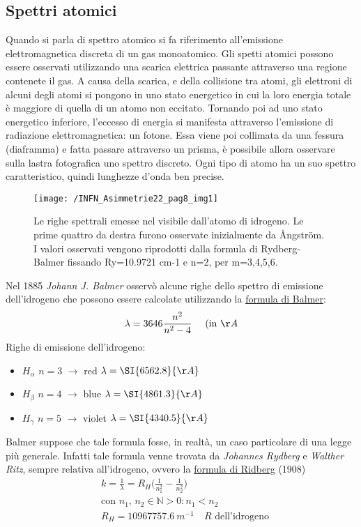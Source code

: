 \subsection{Spettri atomici} 
Quando si parla di spettro atomico si fa riferimento all'emissione elettromagnetica discreta di un gas monoatomico.
Gli spetti atomici possono essere osservati utilizzando una scarica elettrica passante attraverso una regione contenete il gas.
A causa della scarica, e della collisione tra atomi, gli elettroni di alcuni degli atomi si pongono in uno stato energetico in cui la loro energia totale è maggiore di quella di un atomo non eccitato.
Tornando poi ad uno stato energetico inferiore, l'eccesso di energia si manifesta attraverso l'emissione di radiazione elettromagnetica: un fotone.
Essa viene poi collimata da una fessura (diaframma) e fatta passare attraverso un prisma, è possibile allora osservare sulla lastra fotografica uno spettro discreto.
Ogni tipo di atomo ha un suo spettro caratteristico, quindi lunghezze d'onda ben precise.
\begin{figure}[h]
\centering
\texttt{[image: /INFN\_Asimmetrie22\_pag8\_img1]}
\caption{Le righe spettrali emesse nel visibile dall’atomo di idrogeno. Le prime quattro da destra furono osservate inizialmente da Ångström. I valori osservati vengono riprodotti dalla formula di Rydberg-Balmer fissando Ry=10.9721 cm-1 e n=2, per m=3,4,5,6.}
\end{figure}
Nel 1885 \textit{Johann J. Balmer} osservò alcune righe dello spettro di emissione dell'idrogeno che possono essere calcolate utilizzando la \underline{formula di Balmer}:
\begin{equation}
\lambda = 3646 \frac{n^2}{n^2 - 4} \quad \mbox{ (in $\AA$}
\end{equation}
Righe di emissione dell'idrogeno:
\begin{itemize}
\item $H_{\alpha}$ $n=3$ $\rightarrow$ red $\lambda = \SI{6562.8}{\AA}$
\item $H_{\beta}$ $n=4$ $\rightarrow$ blue $\lambda = \SI{4861.3}{\AA}$
\item $H_{\gamma}$ $n=5$ $\rightarrow$ violet $\lambda = \SI{4340.5}{\AA}$
\end{itemize}
Balmer suppose che tale formula fosse, in realtà, un caso particolare di una legge più generale.
Infatti tale formula venne trovata da \textit{Johannes Rydberg} e \textit{Walther Ritz}, sempre relativa all'idrogeno,
ovvero la \underline{formula di Ridberg} (1908)
\begin{equation}
\begin{split}
& k = \frac{1}{\lambda} = R_H \biggl( \frac{1}{n_1^2} - \frac{1}{n_2^2}  \biggr) \\
& \mbox{con } n_{1} \mbox{, } n_{2} \in \mathbb{N} > 0 : n_{1} < n_{2} \\
& R_H = \SI{10967757.6}{m^{-1}} \quad R \mbox{ dell'idrogeno}
\label{formula_Ridberg}
\end{split}
\end{equation}
